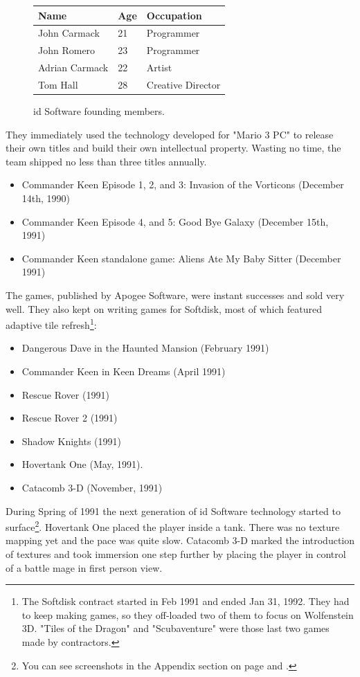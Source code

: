 \documentclass[book.tex]{subfiles}
\begin{document}
 \begin{figure}[H]
\centering  
\begin{tabularx}{\textwidth}{ X  X  X  }
  \toprule
  \textbf{Name} &  \textbf{Age} & \textbf{Occupation} \\
  \toprule 
   John Carmack & 21 &  Programmer\\
   John Romero & 23 &  Programmer\\
   Adrian Carmack & 22 &  Artist\\
   Tom Hall & 28 &  Creative Director\\
     \toprule
\end{tabularx}
\caption{id Software founding members.}\label{fig:Id Software team}
\end{figure}
\pagebreak
They immediately used the technology developed for "Mario 3 PC" to release their own titles and build their own intellectual property. Wasting no time, the team shipped no less than three titles annually.
\begin{itemize}
    \item Commander Keen Episode 1, 2, and 3: Invasion of the Vorticons (December 14th, 1990)
    \item Commander Keen Episode 4, and 5: Good Bye Galaxy (December 15th, 1991)
    \item Commander Keen standalone game: Aliens Ate My Baby Sitter (December 1991)
\end{itemize}
The games, published by Apogee Software, were instant successes and sold very well. They also kept on writing games for Softdisk, most of which featured adaptive tile refresh\footnote{The Softdisk contract started in Feb 1991 and ended Jan 31, 1992. They had to keep making games, so they off-loaded two of them to focus on Wolfenstein 3D. "Tiles of the Dragon" and "Scubaventure" were those last two games made by contractors.}:
\begin{itemize}
  \item Dangerous Dave in the Haunted Mansion (February 1991)
  \item Commander Keen in Keen Dreams (April 1991)
  \item Rescue Rover (1991)
  \item Rescue Rover 2 (1991)
  \item Shadow Knights (1991)
  \item Hovertank One (May, 1991).
  \item Catacomb 3-D (November, 1991)
\end{itemize}
During Spring of 1991 the next generation of id Software technology started to surface\footnote{You can see screenshots in the Appendix section on page \pageref{hovertank3d_screenshot} and \pageref{catacomb3d_screenshot}.}. Hovertank One placed the player inside a tank. There was no texture mapping yet and the pace was quite slow. Catacomb 3-D marked the introduction of textures and took immersion one step further by placing the player in control of a battle mage in first person view. \\
\end{document}
